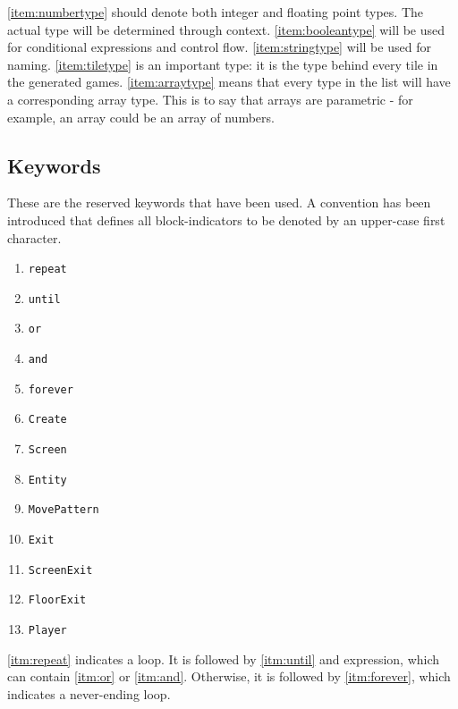 \ref{item:numbertype} should denote both integer and floating point types. The actual type will be determined through context. \ref{item:booleantype} will be used for conditional expressions and control flow.
\ref{item:stringtype} will be used for naming.
\ref{item:tiletype} is an important type: it is the type behind every tile in the generated games.
\ref{item:arraytype} means that every type in the list will have a corresponding array type. This is to say that arrays are parametric - for example, an array could be an array of numbers.


\subsection{Keywords}
These are the reserved keywords that have been used.  A convention has been introduced that defines all block-indicators to be denoted by an upper-case first character.

\begin{multicols}{4}
    \begin{enumerate}
        \item \texttt{repeat}\label{itm:repeat}
        \item \texttt{until}\label{itm:until}
        \item \texttt{or}\label{itm:or}
        \item \texttt{and}\label{itm:and}
        \item \texttt{forever}\label{itm:forever}
        \item \texttt{Create}\label{itm:Create}
        \item \texttt{Screen}\label{itm:Screen}
        \item \texttt{Entity}\label{itm:Entity}
        \item \texttt{MovePattern}\label{itm:MovePattern}
        \item \texttt{Exit}\label{itm:Exit}
        \item \texttt{ScreenExit}\label{itm:ScreenExit}
        \item \texttt{FloorExit}\label{itm:FloorExit}
        \item \texttt{Player}\label{itm:Player}
    \end{enumerate}
\end{multicols}

\ref{itm:repeat} indicates a loop. It is followed by \ref{itm:until} and expression, which can contain \ref{itm:or} or \ref{itm:and}. Otherwise, it is followed by \ref{itm:forever}, which indicates a never-ending loop.

